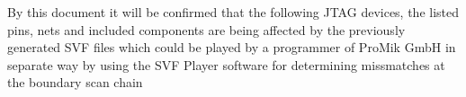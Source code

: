 
 

\maketitle
\newpage

\tableofcontents
\newpage
By this document it will be confirmed that the following JTAG devices, the listed pins, nets and included components are being affected by the previously generated SVF files which could be played by a programmer of ProMik GmbH in separate way by using the SVF Player software for determining missmatches at the boundary scan chain



\makenomenclature
\renewcommand{\nomname}{Definitions, Acronyms and Abbreviations}
\makeatletter
\def\thenomenclature{%
  \subsection{\nomname}
\nompreamble
\list{}{%
\labelwidth\nom@tempdim
\leftmargin\labelwidth
\advance\leftmargin\labelsep
\itemsep\nomitemsep
\let\makelabel\nomlabel}}
\makeatother
\printnomenclature
\newpage

\renewcommand{\bibname}{References}
\hypersetup{urlcolor=black}
\printbibliography 
\newpage

